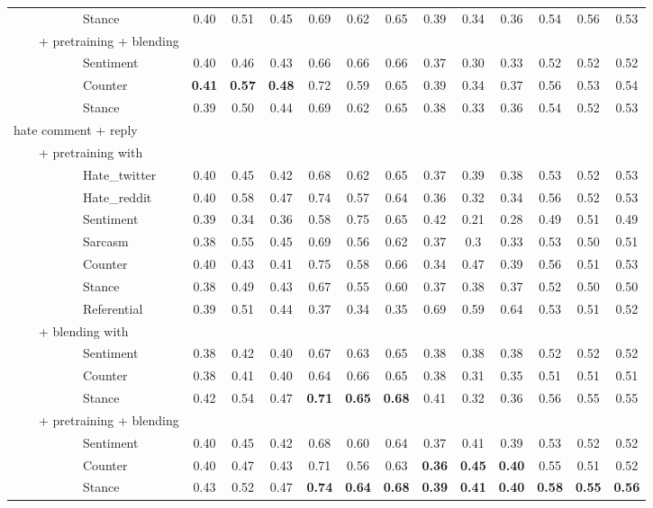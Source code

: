 \documentclass[11pt]{article}
\begin{document}
\begin{table*}
\begin{tabular}{l ccc ccc ccc ccc}
			~~~~~~~~~~~Stance & 0.40 & 0.51 & 0.45 &	0.69 &	0.62 &	0.65 &	0.39 &	0.34 &	0.36  &	0.54 &	0.56 &	0.53 \\
			~~~~+ pretraining + blending \\
			~~~~~~~~~~~Sentiment & 0.40 & 0.46 & 0.43 & 0.66 & 0.66 &	0.66 & 0.37 &	0.30 & 0.33 &	0.52 &	0.52 &	0.52\\
			~~~~~~~~~~~Counter &\textbf{0.41} &	\textbf{0.57} & \textbf{0.48 }&	0.72 &	0.59 &	0.65 & 0.39 &	0.34 &	0.37 &	0.56 &	0.53 &	0.54\\
			~~~~~~~~~~~Stance & 0.39 &	0.50 & 	0.44 &	0.69 &	0.62 &	0.65 &	0.38 &	0.33 &	0.36  &	0.54 &	0.52 &	0.53\\
			hate comment + reply\\
			~~~~+ pretraining with \\
			~~~~~~~~~~~Hate\_twitter & 0.40 & 0.45 & 0.42 &	0.68 &	0.62 & 0.65 & 0.37 &	0.39 &	0.38  & 0.53 & 0.52 &	0.53\\
			~~~~~~~~~~~Hate\_reddit & 0.40 & 0.58 & 0.47 &	0.74 &	0.57 &	0.64 &	0.36 &	0.32 &	0.34  &	0.56 &	0.52 &	0.53\\
			~~~~~~~~~~~Sentiment & 0.39 &  0.34 & 0.36 & 	0.58 & 	0.75 & 	0.65 &  0.42 &  0.21 &  0.28 & 	0.49 & 	0.51 & 	0.49\\
			~~~~~~~~~~~Sarcasm & 0.38 & 0.55 &	0.45 & 0.69 & 0.56 & 	0.62 & 	0.37 & 	0.3 & 0.33 & 	0.53 & 	0.50  & 0.51\\
			~~~~~~~~~~~Counter & 0.40 & 0.43 &  0.41 & 	0.75 & 	0.58 & 	0.66 &	0.34 & 	0.47 & 	0.39  & 	0.56 & 	0.51 & 	0.53\\
			~~~~~~~~~~~Stance & 0.38 &	0.49 &	0.43 &	0.67 &	0.55 &	0.60 &	0.37 &	0.38 &	0.37  &	0.52 &	0.50 &	0.50\\
			~~~~~~~~~~~Referential & 0.39 & 0.51 & 0.44 & 0.37 & 0.34 & 0.35 & 0.69 & 0.59 & 0.64 & 0.53 & 0.51 & 0.52\\
			~~~~+ blending with \\
			~~~~~~~~~~~Sentiment & 0.38 &	0.42 &	0.40 &	0.67 &	0.63 &	0.65 &	0.38 &	0.38 &	0.38 &	0.52 &	0.52 &	0.52\\
			~~~~~~~~~~~Counter &0.38 &	0.41 &	0.40 &	0.64 &	0.66 &	0.65 &	0.38 &	 0.31 &	0.35 &	0.51 &	0.51 &	0.51\\
			~~~~~~~~~~~Stance & 0.42 &	0.54 &	0.47 &	\textbf{0.71} &	\textbf{0.65} &	\textbf{0.68} &	0.41 &	0.32 &	0.36  &	0.56 &	0.55 &	0.55 \\
			~~~~+ pretraining + blending\\
			~~~~~~~~~~~Sentiment & 0.40 &	0.45 &	0.42 &	0.68 &	0.60 &	0.64 &	0.37 &	0.41 &	0.39 &	0.53 &	0.52 &	0.52\\
			~~~~~~~~~~~Counter & 0.40 & 0.47 &	0.43 &	0.71 &	0.56 &	0.63 & \textbf{0.36} &	\textbf{0.45} &	\textbf{0.40}  &	0.55 &	0.51 & 0.52\\
			~~~~~~~~~~~Stance & 0.43 &	0.52 &	0.47&	\textbf{0.74} &	\textbf{0.64} &	\textbf{0.68}  &	\textbf{0.39} &	\textbf{0.41} & \textbf{	0.40} &	\textbf{0.58} &	\textbf{0.55} &	\textbf{0.56} \\
			\bottomrule
			

\end{tabular}
\end{table*}
\end{document}
